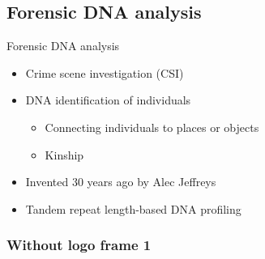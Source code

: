 \documentclass{beamer}
\providecommand{\presentationPlatform}{linux} %
\begin{document}
 \subsection{Forensic DNA analysis}
 \begin{frame}[t]{Forensic DNA analysis}
   \ifdefstring{\presentationPlatform}{linux}
   {} %
   {} %
   \begin{itemize}
     \item<1-> Crime scene investigation (CSI)

     \item<6-> DNA identification of individuals
       \begin{itemize}
       \item<7-> Connecting individuals to places or objects
       \item<8-> Kinship
       \end{itemize}
     \item<9-> Invented 30 years ago by Alec Jeffreys
     \item<10-> Tandem repeat length-based DNA profiling

   \end{itemize}
 \end{frame}

{
 \begin{frame}[t]
   \frametitle{Without logo frame 1}
 \end{frame}
} %
\end{document}
